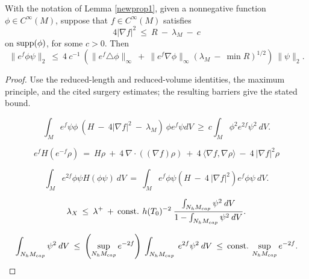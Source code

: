 \begin{lemma}
  \label{lem:kl-alternative-proof-cusp-incompressibility-positivity-entropy}
 \label{newprop2}
With the notation of Lemma \ref{newprop1},
given a nonnegative function $\phi \in C^\infty(M)$,
suppose that $f \in C^\infty(M)$ satisfies
\begin{equation}
4 |\nabla f|^2 \: \le \: R \: - \: \lambda_M \: - \: c
\end{equation}
on $\operatorname{supp}(\phi)$, for some $c > 0$. Then
\begin{equation} \label{eig3}
\|e^f \phi \psi\|_2 \: \le \: 4 \: c^{-1} \: \left( \|e^f \triangle \phi\|_\infty
\: + \: \|e^f \nabla \phi\|_\infty (\lambda_M \: - \: \min R)^{1/2} \right)
\: \|\psi\|_2.
\end{equation}
\end{lemma}

\begin{proof}
\sketch Use the reduced-length and reduced-volume identities, the maximum principle, and the cited surgery estimates; the resulting barriers give the stated bound.

\begin{equation} \label{part1}
\int_M e^f \psi\phi \: (H \: - \: 4 |\nabla f|^2 \: - \: \lambda_M) \: \phi
e^f \psi dV \: \ge \: c \int_M \phi^2 e^{2f} \psi^2 \: dV.
\end{equation}

\begin{equation} \label{Hf}
e^f H (e^{-f} \rho) \: = \: H \rho \: + \: 4 \: \nabla \cdot
((\nabla f) \rho) \: + \: 4 \: \langle \nabla f, \nabla \rho \rangle
\: - \: 4 \: |\nabla f|^2 \rho
\end{equation}

\begin{equation} \label{part2}
\int_M e^{2f} \phi \psi H(\phi \psi) \: dV \: = \:
\int_M e^f \phi \psi (H \: - \: 4 \:
|\nabla f|^2)  e^{f} \phi \psi \: dV.
\end{equation}

\begin{equation} \label{bound11}
\lambda_X \: \le \: \lambda^+ \: + \: \operatorname{const.} \: h(T_0)^{-2} \:
\frac{\int_{N_h M_{cap}} \psi^2 \: dV}{1 - \int_{N_h M_{cap}} \psi^2 \: dV}.
\end{equation}

\begin{equation} \label{bound12}
\int_{N_h M_{cap}} \psi^2 \: dV \: \le \:
\left( \sup_{N_h M_{cap}} e^{-2f} \right) \:
\int_{N_h M_{cap}} \: e^{2f} \psi^2 \: dV \: \le \:
\operatorname{const.} \: \sup_{N_h M_{cap}} e^{-2f}.
\end{equation}
\end{proof}

